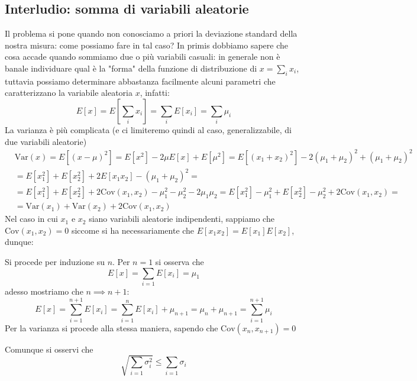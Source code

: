 \documentclass{report}
\begin{document}
\subsection{Interludio: somma di variabili aleatorie}
\noindent Il problema si pone quando non conosciamo a priori la deviazione standard della nostra misura: come possiamo fare in tal caso?
In primis dobbiamo sapere che cosa accade quando sommiamo due o più variabili casuali: in generale non è banale individuare qual è la "forma" della funzione di distribuzione di $x = \sum\limits_i x_i$, tuttavia possiamo determinare abbastanza facilmente alcuni parametri che caratterizzano la variabile aleatoria $x$, infatti:
$$
	E[x] = E \left[ \sum_i x_i \right] = \sum_i E[x_i] = \sum_i \mu_i
$$
La varianza è più complicata (e ci limiteremo quindi al caso, generalizzabile, di due variabili aleatorie)
\begin{align*}
	&\text{Var}(x) = E[(x-\mu)^2] = E[x^2] - 2\mu E[x] + E[\mu^2] = E[(x_1 + x_2)^2] - 2(\mu_1 + \mu_2)^2 + (\mu_1 + \mu_2)^2 & \\
	&= E[x_1^2] + E[x_2^2] + 2E[x_1 x_2] - (\mu_1 + \mu_2)^2 = \\  &= E[x_1^2] + E[x_2^2] + 2\text{Cov}(x_1, x_2) - \mu_1^2 - \mu_2^2 - 2\mu_1 \mu_2 = E[x_1^2] - \mu_1^2 + E[x_2^2] - \mu_2^2 + 2\text{Cov}(x_1, x_2) = \\
	&=\text{Var}(x_1) + \text{Var}(x_2) + 2\text{Cov}(x_1, x_2)
\end{align*}
Nel caso in cui $x_1$ e $x_2$ siano variabili aleatorie indipendenti, sappiamo che $\text{Cov}(x_1, x_2) = 0$ siccome si ha necessariamente che $E[x_1 x_2] = E[x_1]E[x_2]$, dunque:
\begin{myproof}
Si procede per induzione su $n$. Per $n=1$ si osserva che
$$ E[x] = \sum_{i = 1} E[x_i] = \mu_1 $$
adesso mostriamo che $n \implies n+1$:
$$
	E[x] = \sum_{i = 1}^{n+1} E[x_i] = \sum_{i=1}^{n} E[x_i] + \mu_{n+1} = \mu_n + \mu_{n+1} = \sum_{i = 1}^{n+1} \mu_i
$$
Per la varianza si procede alla stessa maniera, sapendo che $\text{Cov}(x_{n}, x_{n+1}) = 0$
\end{myproof}
\noindent Comunque si osservi che
\begin{equation}
	\sqrt{\sum_{i = 1} \sigma_i^2} \leq \sum_{i = 1} \sigma_i
\end{equation}
\end{document}
